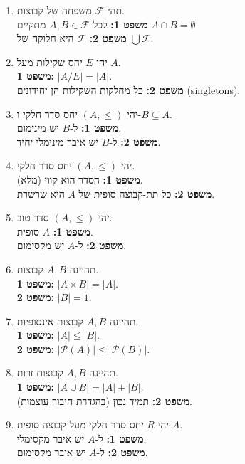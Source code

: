 \documentclass[a4paper,11pt]{article}
\newcommand{\powerset}{\mathcal{P}}
\begin{document}
\begin{enumerate}
    \item תהי \(\mathcal{F}\) משפחה של קבוצות.
          \\ \textbf{משפט 1:} לכל \(A, B \in \mathcal{F}\) מתקיים \(A \cap B = \emptyset\).
          \\ \textbf{משפט 2:} \(\mathcal{F}\) היא חלוקה של \(\bigcup \mathcal{F}\).

    \item יהי \(E\) יחס שקילות מעל \(A\).
          \\ \textbf{משפט 1:} \(|A/E| = |A|\).
          \\ \textbf{משפט 2:} כל מחלקות השקילות הן יחידונים (singletons).

    \item יהי \((A, \le)\) יחס סדר חלקי ו-\(B \subseteq A\).
          \\ \textbf{משפט 1:} ל-\(B\) יש מינימום.
          \\ \textbf{משפט 2:} ל-\(B\) יש איבר מינימלי יחיד.

    \item יהי \((A, \le)\) יחס סדר חלקי.
          \\ \textbf{משפט 1:} הסדר הוא קווי (מלא).
          \\ \textbf{משפט 2:} כל תת-קבוצה סופית של \(A\) היא שרשרת.

    \item יהי \((A, \le)\) סדר טוב.
          \\ \textbf{משפט 1:} \(A\) סופית.
          \\ \textbf{משפט 2:} ל-\(A\) יש מקסימום.

    \item תהיינה \(A, B\) קבוצות.
          \\ \textbf{משפט 1:} \(|A \times B| = |A|\).
          \\ \textbf{משפט 2:} \(|B| = 1\).

    \item תהיינה \(A, B\) קבוצות אינסופיות.
          \\ \textbf{משפט 1:} \(|A| \le |B|\).
          \\ \textbf{משפט 2:} \(|\powerset(A)| \le |\powerset(B)|\).

    \item תהיינה \(A, B\) קבוצות זרות.
          \\ \textbf{משפט 1:} \(|A \cup B| = |A| + |B|\).
          \\ \textbf{משפט 2:} תמיד נכון (בהגדרת חיבור עוצמות).

    \item יהי \(R\) יחס סדר חלקי מעל קבוצה סופית \(A\).
          \\ \textbf{משפט 1:} ל-\(A\) יש איבר מקסימלי.
          \\ \textbf{משפט 2:} ל-\(A\) יש איבר מקסימום.


\end{enumerate}
\end{document}
